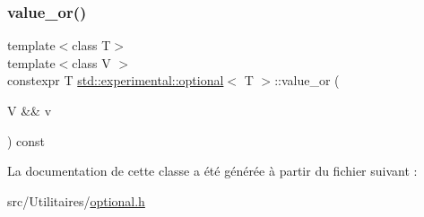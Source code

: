 \mbox{\label{classstd_1_1experimental_1_1optional_a7556c77490cf4fc004291fc7c6696967}} 
\subsubsection{\texorpdfstring{value\+\_\+or()}{value\_or()}}
{\footnotesize\ttfamily template$<$class T$>$ \\
template$<$class V $>$ \\
constexpr T \hyperlink{classstd_1_1experimental_1_1optional}{std\+::experimental\+::optional}$<$ T $>$\+::value\+\_\+or (\begin{DoxyParamCaption}\item[{V \&\&}]{v }\end{DoxyParamCaption}) const\hspace{0.3cm}{\ttfamily [inline]}}



La documentation de cette classe a été générée à partir du fichier suivant \+:\begin{DoxyCompactItemize}
\item 
src/\+Utilitaires/\hyperlink{optional_8h}{optional.\+h}\end{DoxyCompactItemize}
